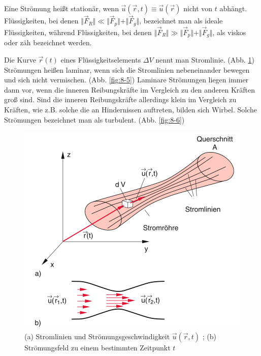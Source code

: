 Eine Strömung heißt stationär, wenn $ \vec{u} ( \vec{r} , t) \equiv \vec{u} ( \vec{r} ) $ nicht von $t$ abhängt.
Flüssigkeiten, bei denen $ \Vert \vec{F}_R \Vert \ll \Vert \vec{F}_p \Vert + \Vert \vec{F}_g \Vert $, bezeichnet man als ideale Flüssigkeiten, während Flüssigkeiten, bei denen $ \Vert \vec{F}_R \Vert \gg \Vert \vec{F}_p \Vert + \Vert \vec{F}_g \Vert $, als viskos oder zäh bezeichnet werden.

Die Kurve $ \vec{r} (t) $ eines Flüssigkeitselements $ \Delta V $ nennt man Stromlinie. (Abb. \ref{fig:8-1}) Strömungen heißen laminar, wenn sich die Stromlinien nebeneinander bewegen und sich nicht vermischen. (Abb. \ref{fig:8-5}) Laminare Strömungen liegen immer dann vor, wenn die inneren Reibungskräfte im Vergleich zu den anderen Kräften groß sind. Sind die inneren Reibungskräfte allerdings klein im Vergleich zu Kräften, wie z.B. solche die an Hindernissen auftreten, bilden sich Wirbel. Solche Strömungen bezeichnet man als turbulent. (Abb. \ref{fig:8-6})

\begin{figure}
        \includegraphics[width=.9\textwidth]{images/8-1}
\caption{(a) Stromlinien und Strömungsgeschwindigkeit $ \vec{u}(\vec{r},t) $ ; (b) Strömungsfeld zu einem bestimmten Zeitpunkt $t$ }
\label{fig:8-1}
\end{figure}


